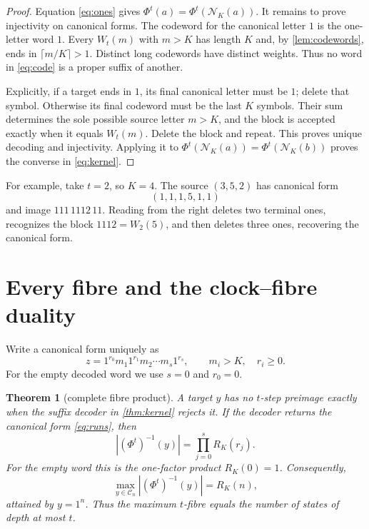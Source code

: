 \documentclass[10pt,a4paper]{amsart}
\newtheorem{theorem}{Theorem}[section]
\theoremstyle{definition}
\theoremstyle{remark}
\newcommand{\Comp}{\mathcal C}
\newcommand{\NF}{\mathcal N}
\begin{document}
\begin{proof}
Equation \eqref{eq:ones} gives
$\Phi^t(a)=\Phi^t(\NF_K(a))$.  It remains to prove injectivity on canonical
forms.  The codeword for the canonical letter $1$ is the one-letter word
$1$.  Every $W_t(m)$ with $m>K$ has length $K$ and, by
\cref{lem:codewords}, ends in $\lceil m/K\rceil>1$.  Distinct long
codewords have distinct weights.  Thus no word in \eqref{eq:code} is a
proper suffix of another.

Explicitly, if a target ends in $1$, its final canonical letter must be
$1$; delete that symbol.  Otherwise its final codeword must be the last
$K$ symbols.  Their sum determines the sole possible source letter $m>K$,
and the block is accepted exactly when it equals $W_t(m)$.  Delete the
block and repeat.  This proves unique decoding and injectivity.  Applying it
to $\Phi^t(\NF_K(a))=\Phi^t(\NF_K(b))$ proves the converse in
\eqref{eq:kernel}.
\end{proof}

For example, take $t=2$, so $K=4$.  The source $(3,5,2)$ has canonical
form
\[
             (1,1,1,5,1,1)
\]
and image $111\,1112\,11$.  Reading from the right deletes two terminal
ones, recognizes the block $1112=W_2(5)$, and then deletes three ones,
recovering the canonical form.

\section{Every fibre and the clock--fibre duality}

Write a canonical form uniquely as
\begin{equation}
 z=1^{r_0}m_1 1^{r_1}m_2\cdots m_s1^{r_s},
 \qquad m_i>K,\quad r_i\geq0.                            \label{eq:runs}
\end{equation}
For the empty decoded word we use $s=0$ and $r_0=0$.

\begin{theorem}[complete fibre product]\label{thm:fibres}
A target $y$ has no $t$-step preimage exactly when the suffix decoder in
\cref{thm:kernel} rejects it.  If the decoder returns the canonical form
\eqref{eq:runs}, then
\begin{equation}
                    |(\Phi^t)^{-1}(y)|
                    =\prod_{j=0}^{s}R_K(r_j).             \label{eq:fibre}
\end{equation}
For the empty word this is the one-factor product $R_K(0)=1$.
Consequently,
\begin{equation}
             \max_{y\in\Comp_n}|(\Phi^t)^{-1}(y)|=R_K(n), \label{eq:maxfibre}
\end{equation}
attained by $y=1^n$.  Thus the maximum $t$-fibre equals the number of
states of depth at most $t$.
\end{theorem}
\end{document}

